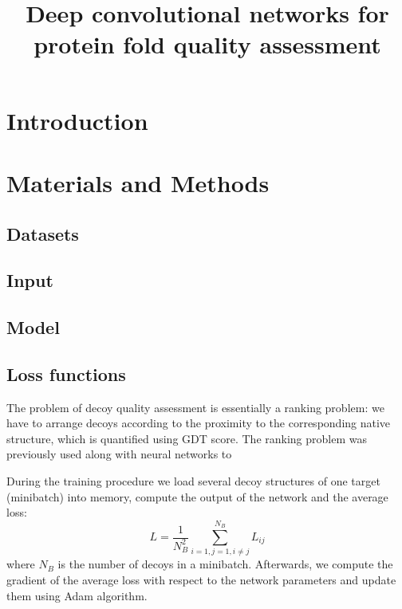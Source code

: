 \documentclass[a4paper,10pt]{article}
\title{Deep convolutional networks for protein fold quality assessment}
\author{}
\begin{document}
\maketitle

\begin{abstract}

\end{abstract}

\section{Introduction}
% 

\section{Materials and Methods}

\subsection{Datasets}
% 

\subsection{Input}
% 

\subsection{Model}
% 

\subsection{Loss functions}

The problem of decoy quality assessment is essentially a ranking problem: we have to arrange decoys according to 
the proximity to the corresponding native structure, which is quantified using GDT score. The ranking problem 
was previously used along with neural networks to 

During the training procedure we load several decoy structures of one target (minibatch) into memory, compute the 
output of the network and the average loss:
$$ L = \frac{1}{N^{2}_B} \sum_{i=1,j=1, i \neq j}^{N_B} L_{ij} $$ 
where $N_B$ is the number of decoys in a minibatch. Afterwards, we compute the gradient of the average loss with respect 
to the network parameters and update them using Adam algorithm.
\end{document}
